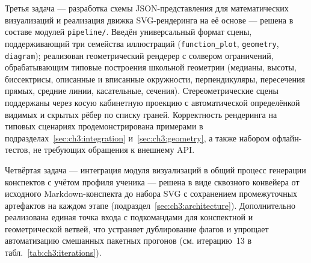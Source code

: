 Третья задача --- разработка схемы JSON\nobreakdash-представления для
математических визуализаций и реализация движка SVG\nobreakdash-рендеринга
на её основе --- решена в составе модулей \texttt{pipeline/}. Введён
универсальный формат сцены, поддерживающий три семейства иллюстраций
(\texttt{function\_plot}, \texttt{geometry}, \texttt{diagram}); реализован
геометрический рендерер с солвером ограничений, обрабатывающим типовые
построения школьной геометрии (медианы, высоты, биссектрисы, описанные и
вписанные окружности, перпендикуляры, пересечения прямых, средние линии,
касательные, сечения). Стереометрические сцены поддержаны через косую
кабинетную проекцию с автоматической определёнкой видимых и скрытых рёбер
по списку граней. Корректность рендеринга на типовых сценариях
продемонстрирована примерами в подразделах~\ref{sec:ch3:integration}
и~\ref{sec:ch3:geometry}, а также набором офлайн\nobreakdash-тестов,
не требующих обращения к внешнему API.

Четвёртая задача --- интеграция модуля визуализаций в общий процесс
генерации конспектов с учётом профиля ученика --- решена в виде сквозного
конвейера от исходного Markdown\nobreakdash-конспекта до набора SVG
с сохранением промежуточных артефактов на каждом этапе
(подраздел~\ref{sec:ch3:architecture}). Дополнительно реализована единая
точка входа  с подкомандами для конспектной
и геометрической ветвей, что устраняет дублирование флагов и упрощает
автоматизацию смешанных пакетных прогонов
(см. итерацию~13 в табл.~\ref{tab:ch3:iterations}).

